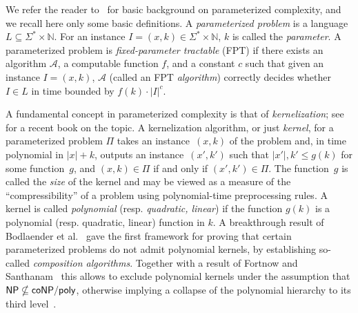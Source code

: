 \documentclass[a4paper,UKenglish,cleveref, autoref]{lipics-v2019}
\newcommand{\ig}[1]{\textcolor{red}{[Ig: #1]}}
\newcommand{\Acal}{\mathcal{A}}
\begin{document}
We refer the reader to~\cite{DF13,CyganFKLMPPS15} for basic background on parameterized complexity, and we recall here only some basic definitions.
	A \emph{parameterized problem} is a language $L \subseteq \Sigma^* \times \mathbb{N}$.  For an instance $I=(x,k) \in \Sigma^* \times \mathbb{N}$, $k$ is called the \emph{parameter}. %
	A parameterized problem is \emph{fixed-parameter tractable} ({\sf FPT}) if there exists an algorithm $\Acal$, a computable function $f$, and a constant $c$ such that given an instance $I=(x,k)$,
	$\Acal$ (called an {\sf FPT} \emph{algorithm}) correctly decides whether $I \in L$ in time bounded by $f(k) \cdot |I|^c$.

A fundamental concept in parameterized complexity is that of \emph{kernelization}; see~\cite{book-kernels} for a recent book on the topic. A kernelization
	algorithm, or just \emph{kernel}, for a parameterized problem $\Pi $ takes an
	instance~$(x,k)$ of the problem and, in time polynomial in $|x| + k$, outputs
	an instance~$(x',k')$ such that $|x'|, k' \leqslant g(k)$ for some
	function~$g$, and $(x,k) \in \Pi$ if and only if $(x',k') \in \Pi$. The function~$g$ is called the \emph{size} of the kernel and may
	be viewed as a measure of the ``compressibility'' of a problem using
	polynomial-time preprocessing rules. A kernel is called \emph{polynomial} (resp. \emph{quadratic, linear}) if the function $g(k)$ is a polynomial (resp. quadratic, linear) function in $k$.
	A breakthrough result of Bodlaender et al.~\cite{BodlaenderDFH09} gave the first framework for proving that certain parameterized problems
	do not admit polynomial kernels, by establishing so-called \emph{composition algorithms}. Together with a result of Fortnow and
	Santhanam~\cite{FortnowS11} this allows to exclude polynomial kernels under the assumption that ${\sf NP} \nsubseteq {\sf coNP} / {\sf poly}$, otherwise implying
	a collapse of the polynomial hierarchy to its third level~\cite{Yap83}.
\end{document}
